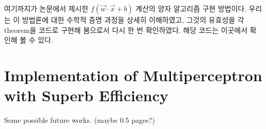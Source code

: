 여기까지가 논문에서 제시한 \(f(\vec{w}\cdot\vec{x}+b)\) 계산의 양자 알고리즘 구현 방법이다.
우리는 이 방법론에 대한 수학적 증명 과정을 상세히 이해하였고, 그것의 유효성을 각 theorem을 코드로 구현해 봄으로서 다시 한 번 확인하였다. 해당 코드는 이곳에서 확인해 봃 수 있다.

\section{Implementation of Multiperceptron with Superb Efficiency}
Some possible future works. (maybe 0.5 pages?)
